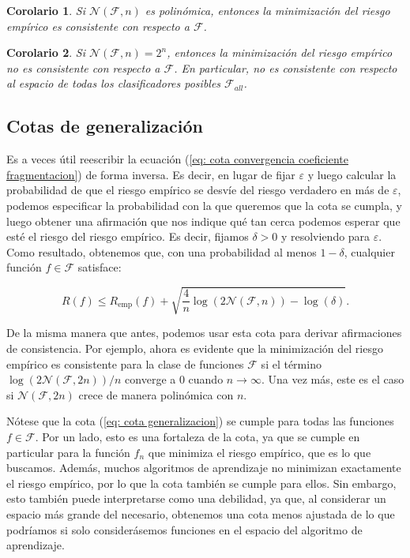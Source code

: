\documentclass{report}
\newtheorem{cor}{Corolario}[thm]
\begin{document}
\begin{cor}
    Si $\mathcal{N}(\mathcal{F}, n)$ es polinómica, entonces la minimización del riesgo empírico es consistente con respecto a $\mathcal{F}$.\\
\end{cor}
\begin{cor}
    Si $\mathcal{N}(\mathcal{F}, n)=2^n$, entonces la minimización del riesgo empírico no es consistente con respecto a $\mathcal{F}$. En
    particular, no es consistente con respecto al espacio de todas los clasificadores posibles $\mathcal{F}_{all}$.
\end{cor}

\subsection{Cotas de generalización}

Es a veces útil reescribir la ecuación (\ref{eq: cota convergencia coeficiente fragmentacion}) de forma inversa. Es decir, en lugar de
fijar \(\varepsilon\) y
luego calcular la probabilidad de que el riesgo empírico se desvíe del riesgo verdadero en más de \(\varepsilon\),
podemos especificar la probabilidad con la que queremos que la cota se cumpla, y luego obtener una afirmación
que nos indique qué tan cerca podemos esperar que esté el riesgo del riesgo empírico. Es decir, fijamos \(\delta > 0\)
y resolviendo para \(\varepsilon\). Como resultado, obtenemos que, con una probabilidad al menos \(1 - \delta\), cualquier
función \(f \in \mathcal{F}\) satisface:

\begin{equation}
    R(f) \leq R_{\text{emp}}(f) + \sqrt{\frac{4}{n} \log(2\mathcal{N}(\mathcal{F}, n)) - \log(\delta)}. \label{eq: cota generalizacion}
\end{equation}


De la misma manera que antes, podemos usar esta cota para derivar afirmaciones de consistencia. Por ejemplo,
ahora es evidente que la minimización del riesgo empírico es consistente para la clase de funciones \(\mathcal{F}\)
si el término \(\log(2\mathcal{N}(\mathcal{F}, 2n))/n\) converge a \(0\) cuando \(n \to \infty\). Una vez más,
este es el caso si \(\mathcal{N}(\mathcal{F}, 2n)\) crece de manera polinómica con \(n\).

Nótese que la cota (\ref{eq: cota generalizacion}) se cumple para todas las funciones \(f \in \mathcal{F}\).
Por un lado, esto es una fortaleza
de la cota, ya que se cumple en particular para la función \(f_n\) que minimiza el riesgo empírico, que es lo que
buscamos. Además, muchos algoritmos de aprendizaje no minimizan exactamente el riesgo empírico, por lo que la cota
también se cumple para ellos. Sin embargo, esto también puede interpretarse como una debilidad, ya que, al considerar
un espacio más grande del necesario, obtenemos una cota menos ajustada de lo que podríamos si solo considerásemos
funciones en el espacio del algoritmo de aprendizaje.
\end{document}
